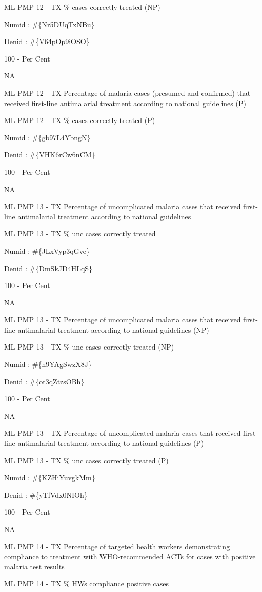 \documentclass[]{book}
\begin{document}
ML PMP 12 - TX \% cases correctly treated (NP)

Numid : \#\{Nr5DUqTxNBu\}

Denid : \#\{V64pOp9iOSO\}

100 - Per Cent

NA

ML PMP 12 - TX Percentage of malaria cases (presumed and confirmed) that received first-line antimalarial treatment according to national guidelines (P)

ML PMP 12 - TX \% cases correctly treated (P)

Numid : \#\{gb97L4YbngN\}

Denid : \#\{VHK6rCw6nCM\}

100 - Per Cent

NA

ML PMP 13 - TX Percentage of uncomplicated malaria cases that received first-line antimalarial treatment according to national guidelines

ML PMP 13 - TX \% unc cases correctly treated

Numid : \#\{JLxVyp3qGve\}

Denid : \#\{DmSkJD4HLqS\}

100 - Per Cent

NA

ML PMP 13 - TX Percentage of uncomplicated malaria cases that received first-line antimalarial treatment according to national guidelines (NP)

ML PMP 13 - TX \% unc cases correctly treated (NP)

Numid : \#\{n9YAgSwzX8J\}

Denid : \#\{ot3qZtzsOBh\}

100 - Per Cent

NA

ML PMP 13 - TX Percentage of uncomplicated malaria cases that received first-line antimalarial treatment according to national guidelines (P)

ML PMP 13 - TX \% unc cases correctly treated (P)

Numid : \#\{KZHiYuvgkMm\}

Denid : \#\{yTfVdx0NIOh\}

100 - Per Cent

NA

ML PMP 14 - TX Percentage of targeted health workers demonstrating compliance to treatment with WHO-recommended ACTs for cases with positive malaria test results

ML PMP 14 - TX \% HWs compliance positive cases
\end{document}
